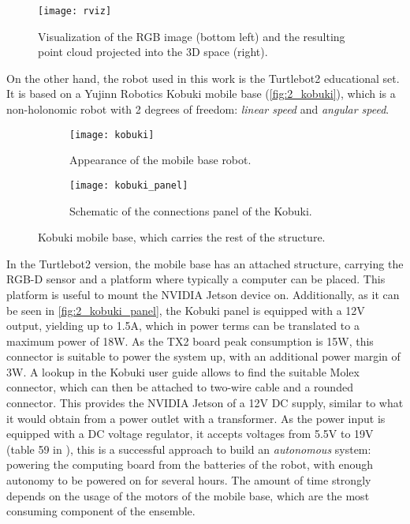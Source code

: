 \begin{figure}[h]
	\centering
	\texttt{[image: rviz]}
	\caption{Visualization of the RGB image (bottom left) and the resulting point cloud projected into the 3D space (right).}
	\label{fig:2_rviz}
	
\end{figure}

On the other hand, the robot used in this work is the Turtlebot2 educational set. It is based on a Yujinn Robotics Kobuki mobile base (\autoref{fig:2_kobuki}), which is a non-holonomic robot with 2 degrees of freedom: \textit{linear speed} and \textit{angular speed}.\\
\begin{figure}[h]
	\centering
	\begin{subfigure}[h]{0.4\linewidth}
		\centering
		\texttt{[image: kobuki]}
		\caption{Appearance of the mobile base robot.}
		\label{fig:2_kobuki_appearance}
	\end{subfigure}
\begin{subfigure}[h]{0.5\linewidth}
	\centering
	\texttt{[image: kobuki\_panel]}
	\caption{Schematic of the connections panel of the Kobuki.}
	\label{fig:2_kobuki_panel}
\end{subfigure}
\caption{Kobuki mobile base, which carries the rest of the structure.}
\label{fig:2_kobuki}
\end{figure}

In the Turtlebot2 version, the mobile base has an attached structure, carrying the RGB-D sensor and a platform where typically a computer can be placed. This platform is useful to mount the NVIDIA Jetson device on. Additionally, as it can be seen in \autoref{fig:2_kobuki_panel}, the Kobuki panel is equipped with a 12V output, yielding up to 1.5A, which in power terms can be translated to a maximum power of 18W. As the TX2 board peak consumption is 15W, this connector is suitable to power the system up, with an additional power margin of 3W. A lookup in the Kobuki user guide \cite{kobuki_manual} allows to find the suitable Molex connector, which can then be attached to two-wire cable and a rounded connector. This provides the NVIDIA Jetson of a 12V DC supply, similar to what it would obtain from a power outlet with a transformer. As the power input is equipped with a DC voltage regulator, it accepts voltages from 5.5V to 19V (table 59 in \cite{tx2_manual}), this is a successful approach to build an \textit{autonomous} system: powering the computing board from the batteries of the robot, with enough autonomy to be powered on for several hours. The amount of time strongly depends on the usage of the motors of the mobile base, which are the most consuming component of the ensemble.\\

